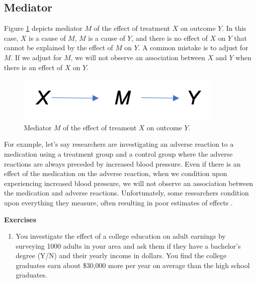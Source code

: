 \documentclass[]{book}
\providecommand{\tightlist}{%
  \setlength{\itemsep}{0pt}\setlength{\parskip}{0pt}}
\begin{document}
\hypertarget{mediator}{%
\subsection{Mediator}\label{mediator}}

Figure \ref{fig:mediator} depicts mediator \(M\) of the effect of treatment \(X\) on outcome \(Y\). In this case, \(X\) is a cause of \(M\), \(M\) is a cause of \(Y\), and there is no effect of \(X\) on \(Y\) that cannot be explained by the effect of \(M\) on \(Y\). A common mistake is to adjust for \(M\). If we adjust for \(M\), we will not observe an association between \(X\) and \(Y\) when there is an effect of \(X\) on \(Y\).

\begin{figure}
\centering
\includegraphics{./images/mediator.png}
\caption{\label{fig:mediator} Mediator \(M\) of the effect of treament \(X\) on outcome \(Y\).}
\end{figure}

For example, let's say researchers are investigating an adverse reaction to a medication using a treatment group and a control group where the adverse reactions are always preceded by increased blood pressure. Even if there is an effect of the medication on the adverse reaction, when we condition upon experiencing increased blood pressure, we will not observe an association between the medication and adverse reactions. Unfortunately, some researchers condition upon everything they measure, often resulting in poor estimates of effects \citep{hernan2002causal}.

\textbf{Exercises}

\begin{enumerate}
\def\labelenumi{\arabic{enumi}.}
\tightlist
\item
  You investigate the effect of a college education on adult earnings by surveying 1000 adults in your area and ask them if they have a bachelor's degree (Y/N) and their yearly income in dollars. You find the college graduates earn about \$30,000 more per year on average than the high school graduates.
\end{enumerate}
\end{document}
